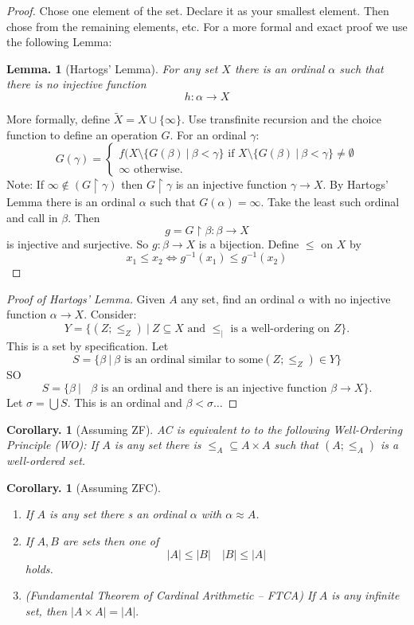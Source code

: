 \documentclass[a4paper,oneside,11pt,DIV=12,parskip=half]{scrartcl}
\theoremstyle{plain}
\newtheorem{lemma}[theorem]{Lemma.}
\newtheorem{corollary}[theorem]{Corollary.}
\theoremstyle{definition}
\newtheorem{remark, definition}[theorem]{Remark and Definition.}
\newtheorem{lemma, definition}[theorem]{Lemma and Definition.}
\newtheorem{theorem, definition}[theorem]{Theorem and Definition.}
\theoremstyle{remark}
\newtheorem*{remark, example}{\textbf{Remark and Exercise}}
\begin{document}
\begin{proof}
Chose one element of the set. Declare it as your smallest element. Then chose from the remaining elements, etc. For a more formal and exact proof we use the following Lemma: \begin{lemma}[Hartogs' Lemma]\label{Lm:Hartogs}
For any set $X$ there is an ordinal $\alpha$ such that there is no injective function 
\[ h: \alpha \rightarrow X \]
\end{lemma} More formally, define $\tilde{X} = X \cup \{ \infty \}$. Use transfinite recursion and the choice function to define an operation $G$. For an ordinal $\gamma$:
\[ G(\gamma) = \begin{cases} f(X \setminus \{ G(\beta) ~|~ \beta < \gamma \} \text{ if } X \setminus \{ G(\beta) ~|~ \beta < \gamma \} \neq \emptyset \\
\infty \text{ otherwise.} \end{cases} \]
Note: If $\infty \not \in (G \upharpoonright \gamma)$ then $G \upharpoonright \gamma$ is an injective function $\gamma \rightarrow X$. By Hartogs' Lemma there is an ordinal $\alpha$ such that $G(\alpha) = \infty$. Take the least such ordinal and call in $\beta$. Then
\[ g = G \upharpoonright \beta: \beta \rightarrow X \] is injective and surjective. So $g: \beta \rightarrow X$ is a bijection. Define $\leq$ on $X$ by
\[ x_1 \leq x_2 \Leftrightarrow g^{-1}(x_1) \leq g^{-1}(x_2) \] 
\end{proof}

\begin{proof}[Proof of Hartogs' Lemma]
Given $A$ any set, find an ordinal $\alpha$ with no injective function $\alpha \rightarrow X$. Consider:
\[ Y = \{(Z; \leq_Z) ~|~ Z \subseteq X \text{ and $\leq_|$ is a well-ordering on $Z$} \}. \]
This is a set by specification. Let 
\[ S = \{ \beta ~|~ \beta \text{ is an ordinal similar to some} (Z;\leq_Z) \in Y \} \]
SO 
\[ S = \{ \beta ~|~ \text{ $\beta$ is an ordinal and there is an injective function } \beta \rightarrow X \}. \]
Let $\sigma = \bigcup S$. This is an ordinal and $\beta < \sigma \dots$
\end{proof}

\begin{corollary}[Assuming ZF]\label{Cor_AC=WO} AC is equivalent to to the following \emph{Well-Ordering Principle} (WO): If $A$ is any set there is $\leq_A \subseteq A \times A$ such that $(A;\leq_A)$ is a well-ordered set. 
\end{corollary}

\begin{corollary}[Assuming ZFC]
\begin{enumerate}
    \item If $A$ is any set there s an ordinal $\alpha$ with $\alpha \approx A$.
    \item If $A,B$ are sets then one of 
        \[ |A| \leq |B| \quad |B| \leq |A| \]
    holds.
    \item (Fundamental Theorem of Cardinal Arithmetic -- FTCA) \label{Th:FTCA}
    If $A$ is any infinite set, then $|A \times A| = |A|.$
\end{enumerate}
\end{corollary}
\end{document}
